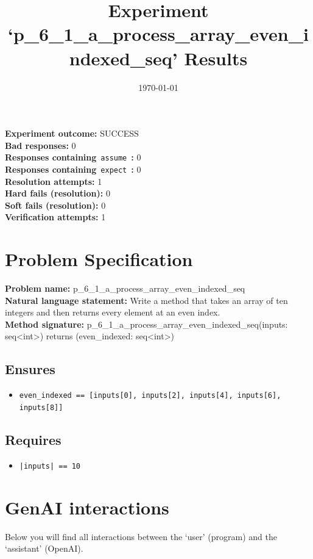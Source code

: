 \documentclass{article}
\begin{document}
\title{Experiment `p\_6\_1\_a\_process\_array\_even\_indexed\_seq' Results}
\author{\today}
\date{}
\maketitle
\textbf{Experiment outcome: }SUCCESS
\\\textbf{Bad responses: }0
\\\textbf{Responses containing}~\texttt{assume}~\textbf{: }0
\\\textbf{Responses containing}~\texttt{expect}~\textbf{: }0
\\\textbf{Resolution attempts: }1
\\\textbf{Hard fails (resolution): }0
\\\textbf{Soft fails (resolution): }0
\\\textbf{Verification attempts: }1
\section*{Problem Specification}
\textbf{Problem name: }p\_6\_1\_a\_process\_array\_even\_indexed\_seq
\\\textbf{Natural language statement: }Write a method that takes an array of ten integers and then returns every element at an even index.
\\\textbf{Method signature: }p\_6\_1\_a\_process\_array\_even\_indexed\_seq(inputs: seq<int>) returns (even\_indexed: seq<int>)
\subsection*{Ensures}
\begin{itemize}
\item \texttt{even\_indexed == [inputs[0], inputs[2], inputs[4], inputs[6], inputs[8]]}
\end{itemize}
\subsection*{Requires}
\begin{itemize}
\item \texttt{|inputs| == 10}
\end{itemize}
\clearpage
\section*{GenAI interactions}
Below you will find all interactions between the `user' (program) and the `assistant' (OpenAI).
\end{document}
